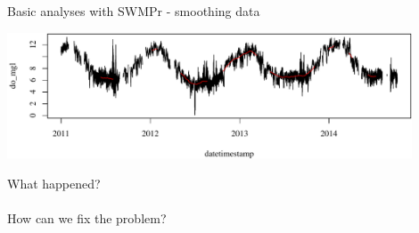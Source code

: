 \documentclass[xcolor=dvipsnames]{beamer}\usepackage[]{graphicx}\usepackage[]{color}
\newenvironment{knitrout}{}{} %
\begin{document}
\begin{frame}[fragile]{Basic analyses with SWMPr - smoothing data}
\begin{knitrout}\scriptsize
{}\color{fgcolor}

{\centering \includegraphics[width=0.9\textwidth]{figure/unnamed-chunk-16-1} 

}



\end{knitrout}
What happened?  \\~\\
How can we fix the problem? 
\end{frame}
\end{document}
